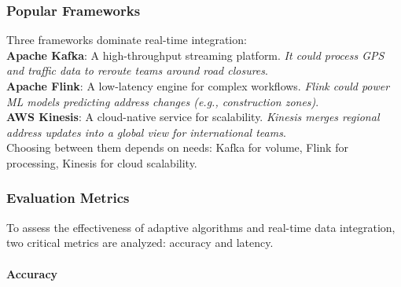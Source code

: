         \subsubsection{Popular Frameworks}

        Three frameworks dominate real-time integration: \autocite{Ranjbary2024Sep}\\
        \textbf{Apache Kafka}: A high-throughput streaming platform. \textit{It could process GPS and traffic data to reroute teams around road closures}.\\
        \textbf{Apache Flink}: A low-latency engine for complex workflows. \textit{Flink could power ML models predicting address changes (e.g., construction zones)}.\\
        \textbf{AWS Kinesis}: A cloud-native service for scalability. \textit{Kinesis merges regional address updates into a global view for international teams}.\\
        
        Choosing between them depends on needs: Kafka for volume, Flink for processing, Kinesis for cloud scalability.


        \subsubsection{Evaluation Metrics}
        \label{sec:evaluation-metrics}

        To assess the effectiveness of adaptive algorithms and real-time data integration, two critical metrics are analyzed: accuracy and latency.

        \paragraph{Accuracy}
        \label{par:accuracy}

